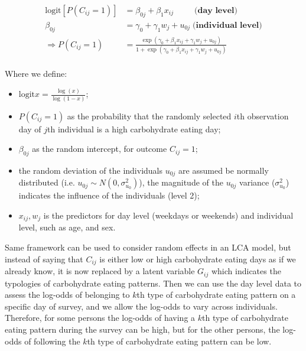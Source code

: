 \begin{equation}
\begin{aligned}
\text{logit}[P(C_{ij} = 1)] & = \beta_{0j} + \beta_{1}x_{ij} \;\;\;\;\;\;\;\;\; \textbf{(day level)}  \\
\beta_{0j} & = \gamma_0 + \gamma_1 w_j + u_{0j} \; \textbf{(individual level)} \\ 
\Rightarrow P(C_{ij} = 1) & = \frac{\exp{(\gamma_0 + \beta_{1}x_{ij} + \gamma_1 w_j + u_{0j})}}{1 + \exp{(\gamma_0 + \beta_{1}x_{ij} + \gamma_1 w_j + u_{0j})}} \\
\end{aligned}
\label{randomLCA}
\end{equation}
\vspace{-0.3cm}

Where we define: 

\begin{itemize}
	\item $\text{logit}{x} = \frac{\log(x)}{\log(1-x)}$;
	\item $P(C_{ij} = 1)$ as the probability that the randomly selected $i$th observation day of $j$th individual is a high carbohydrate eating day;
	\item $\beta_{0j}$ as the random intercept, for outcome $C_{ij} = 1$; 
	\item the random deviation of the individuals $u_{0j}$ are assumed be normally distributed (i.e. $u_{0j} \sim N(0, \sigma_{u_0}^2)$), the magnitude of the $u_{0j}$ variance ($\sigma_{u_0}^2$) indicates the influence of the individuals (level 2);
	\item $x_{ij}, w_j$ is the predictors for day level (weekdays or weekends) and individual level, such as age, and sex.
\end{itemize}



Same framework can be used to consider random effects in an LCA model, but instead of saying that $C_{ij}$ is either low or high carbohydrate eating days as if we already know, it is now replaced by a latent variable $G_{ij}$ which indicates the typologies of carbohydrate eating patterns. Then we can use the day level data to assess the log-odds of belonging to $k$th type of carbohydrate eating pattern on a specific day of survey, and we allow the log-odds to vary across individuals. Therefore, for some persons the log-odds of having a $k$th type of carbohydrate eating pattern during the survey can be high, but for the other persons, the log-odds of following the $k$th type of carbohydrate eating pattern can be low. 


